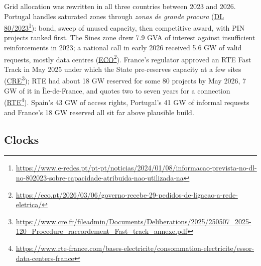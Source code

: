 \documentclass[11pt]{article}
\newcommand{\src}[2]{\href{#1}{#2}\footnote{\url{#1}}}
\begin{document}
Grid allocation was rewritten in all three countries between 2023 and 2026. Portugal handles saturated zones through \emph{zonas de grande procura} (\src{https://www.e-redes.pt/pt-pt/noticias/2024/01/08/informacao-prevista-no-dl-no-802023-sobre-capacidade-atribuida-nao-utilizada-na}{DL 80/2023}): bond, sweep of unused capacity, then competitive award, with PIN projects ranked first. The Sines zone drew 7.9 GVA of interest against insufficient reinforcements in 2023; a national call in early 2026 received 5.6 GW of valid requests, mostly data centres (\src{https://eco.pt/2026/03/06/governo-recebe-29-pedidos-de-ligacao-a-rede-eletrica/}{ECO}). France's regulator approved an RTE Fast Track in May 2025 under which the State pre-reserves capacity at a few sites (\src{https://www.cre.fr/fileadmin/Documents/Deliberations/2025/250507_2025-120_Procedure_raccordement_Fast_track_annexe.pdf}{CRE}); RTE had about 18 GW reserved for some 80 projects by May 2026, 7 GW of it in Île-de-France, and quotes two to seven years for a connection (\src{https://www.rte-france.com/bases-electricite/consommation-electricite/essor-data-centers-france}{RTE}). Spain's 43 GW of access rights, Portugal's 41 GW of informal requests and France's 18 GW reserved all sit far above plausible build.

\subsection{Clocks}
\end{document}
